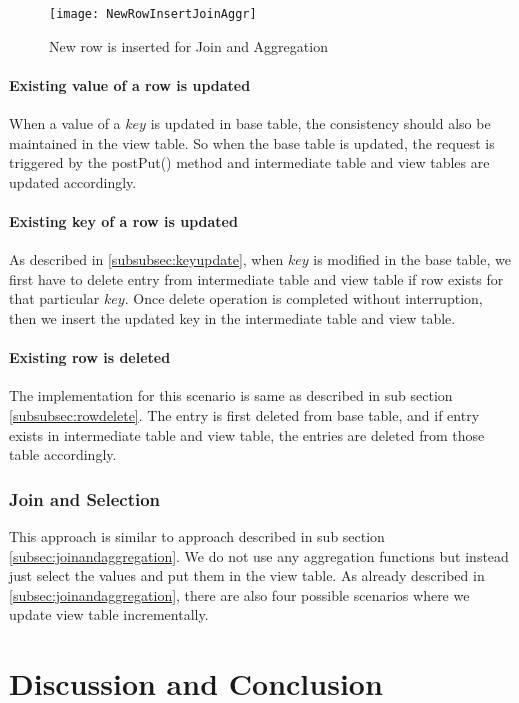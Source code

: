 \documentclass[11pt,a4paper,bibtotoc,idxtotoc,headsepline,footsepline,footexclude,BCOR12mm,DIV13]{scrbook}
\begin{document}
\begin{figure}
	\centering
	\texttt{[image: NewRowInsertJoinAggr]}
	\caption{New row is inserted for Join and Aggregation}
	\label{sec:insertnewrowjoinandaggr}
	
\end{figure}

\newpage

\subsubsection{Existing value of a row is updated}
When a value of a $key$ is updated in base table, the consistency should also be maintained in the view table. So when the base table is updated, the request is triggered by the postPut() method and intermediate table and view tables are updated accordingly.

\subsubsection{Existing key of a row is updated}
As described in \ref{subsubsec:keyupdate}, when $key$ is modified in the base table, we first have to delete entry from intermediate table and view table if row exists for that particular $key$. Once delete operation is completed without interruption, then we insert the updated key in the intermediate table and view table.

\subsubsection{Existing row is deleted}
The implementation for this scenario is same as described in sub section \ref{subsubsec:rowdelete}. The entry is first deleted from base table, and if entry exists in intermediate table and view table, the entries are deleted from those table accordingly.

\subsection{Join and Selection}
This approach is similar to approach described in sub section \ref{subsec:joinandaggregation}. We do not use any aggregation functions but instead just select the values and put them in the view table. As already described in \ref{subsec:joinandaggregation}, there are also four possible scenarios where we update view table incrementally.

\newpage
\chapter{Discussion and Conclusion}
\end{document}
